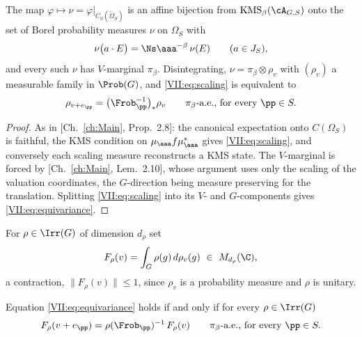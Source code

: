 \begin{proposition}\label{VII:prop:kmsmeasure}
The map $\varphi\mapsto\nu=\varphi|_{C_0(\widetilde\Omega_S)}$ is an affine bijection from
$\mathrm{KMS}_\beta(\cA_{G,S})$ onto the set of Borel probability measures $\nu$ on
$\Omega_S$ with
\begin{equation}\label{VII:eq:scaling}
\nu\bigl(a\cdot E\bigr)=\Ns\aaa^{-\beta}\,\nu(E)\qquad(a\in J_S),
\end{equation}
and every such $\nu$ has $V$-marginal $\pi_\beta$. Disintegrating, $\nu=\pi_\beta\otimes\rho_v$
with $(\rho_v)$ a measurable family in $\Prob(G)$, and \eqref{VII:eq:scaling} is equivalent to
\begin{equation}\label{VII:eq:equivariance}
\rho_{v+e_\pp}=\bigl(\Frob_\pp^{-1}\bigr)_*\rho_v\qquad\pi_\beta\text{-a.e., for every }\pp\in S.
\end{equation}
\end{proposition}

\begin{proof}
As in [Ch.~\ref{ch:Main}, Prop.~2.8]: the canonical expectation onto $C(\Omega_S)$ is
faithful, the KMS condition on $\mu_\aaa f\mu_\aaa^*$ gives \eqref{VII:eq:scaling}, and
conversely each scaling measure reconstructs a KMS state. The $V$-marginal is forced by
[Ch.~\ref{ch:Main}, Lem.~2.10], whose argument uses only the scaling of the valuation coordinates,
the $G$-direction being measure preserving for the translation.
Splitting \eqref{VII:eq:scaling} into its $V$- and $G$-components gives \eqref{VII:eq:equivariance}.
\end{proof}

\begin{definition}\label{VII:def:F}
For $\rho\in\Irr(G)$ of dimension $d_\rho$ set
\[
F_\rho(v)=\int_G\rho(g)\,d\rho_v(g)\ \in\ M_{d_\rho}(\C),
\]
a contraction, $\|F_\rho(v)\|\le1$, since $\rho_v$ is a probability measure and $\rho$ is
unitary.
\end{definition}

\begin{lemma}\label{VII:lem:coho}
Equation \eqref{VII:eq:equivariance} holds if and only if for every $\rho\in\Irr(G)$
\begin{equation}\label{VII:eq:coho}
F_\rho(v+e_\pp)=\rho(\Frob_\pp)^{-1}\,F_\rho(v)\qquad\pi_\beta\text{-a.e., for every }\pp\in S .
\end{equation}
\end{lemma}

